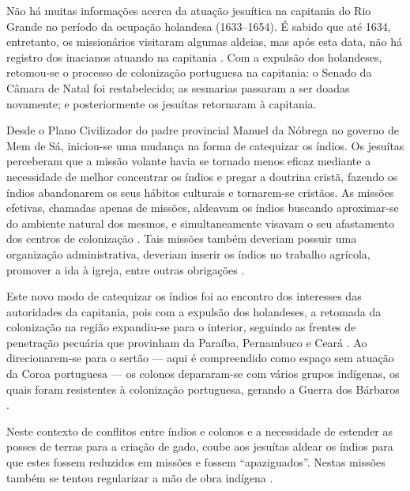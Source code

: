 \begin{refsection}
Não há muitas informações acerca da atuação jesuítica na capitania do Rio Grande no período da ocupação holandesa (1633--1654). É sabido que até 1634, entretanto, os missionários visitaram algumas aldeias, mas após esta data, não há registro dos inacianos atuando na capitania \cite[p.~91]{Porto2000}. Com a expulsão dos holandeses, retomou-se o processo de colonização portuguesa na capitania: o Senado da Câmara de Natal foi restabelecido; as sesmarias passaram a ser doadas novamente; e posteriormente os jesuítas retornaram à capitania.  

Desde o Plano Civilizador do padre provincial Manuel da Nóbrega no governo de Mem de Sá, iniciou-se uma mudança na forma de catequizar os índios. Os jesuítas perceberam que a missão volante havia se tornado menos eficaz mediante a necessidade de melhor concentrar os índios e pregar a doutrina cristã, fazendo os índios abandonarem os seus hábitos culturais e tornarem-se cristãos. As missões efetivas, chamadas apenas de missões, aldeavam os índios buscando aproximar-se do ambiente natural dos mesmos, e simultaneamente visavam o seu afastamento dos centros de colonização \cite{Azevedo1959}. Tais missões também deveriam possuir uma organização administrativa, deveriam inserir os índios no trabalho agrícola, promover a ida à igreja, entre outras obrigações \cite[p.~162]{Lopes2003}. 

Este novo modo de catequizar os índios foi ao encontro dos interesses das autoridades da capitania, pois com a expulsão dos holandeses, a retomada da colonização na região expandiu-se para o interior, seguindo as frentes de penetração pecuária que provinham da Paraíba, Pernambuco e Ceará \cite[p.~129]{Lopes2003}. Ao direcionarem-se para o sertão --- aqui é compreendido como espaço sem atuação da Coroa portuguesa \cite[p.~112]{Silva2010} --- os colonos depararam-se com vários grupos indígenas, os quais foram resistentes à colonização portuguesa, gerando a Guerra dos Bárbaros \cites[p.~96]{Cascudo1984}{Dias2015}{Silva2015}.  

Neste contexto de conflitos entre índios e colonos e a necessidade de estender as posses de terras para a criação de gado, coube aos jesuítas aldear os índios para que estes fossem reduzidos em missões e fossem “apaziguados”. Nestas missões também se tentou regularizar a mão de obra indígena \cite[p.~95]{Porto2000}. 


\end{refsection}
